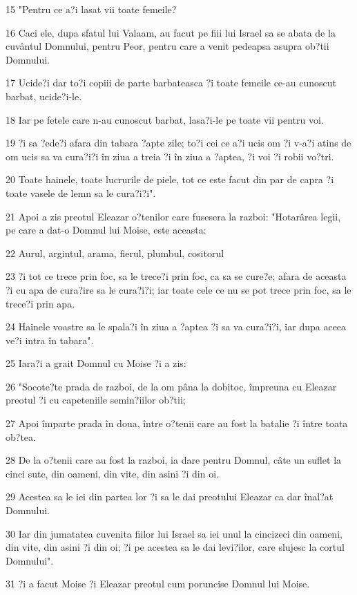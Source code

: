 \par 15 "Pentru ce a?i lasat vii toate femeile?
\par 16 Caci ele, dupa sfatul lui Valaam, au facut pe fiii lui Israel sa se abata de la cuvântul Domnului, pentru Peor, pentru care a venit pedeapsa asupra ob?tii Domnului.
\par 17 Ucide?i dar to?i copiii de parte barbateasca ?i toate femeile ce-au cunoscut barbat, ucide?i-le.
\par 18 Iar pe fetele care n-au cunoscut barbat, lasa?i-le pe toate vii pentru voi.
\par 19 ?i sa ?ede?i afara din tabara ?apte zile; to?i cei ce a?i ucis om ?i v-a?i atins de om ucis sa va cura?i?i în ziua a treia ?i în ziua a ?aptea, ?i voi ?i robii vo?tri.
\par 20 Toate hainele, toate lucrurile de piele, tot ce este facut din par de capra ?i toate vasele de lemn sa le cura?i?i".
\par 21 Apoi a zis preotul Eleazar o?tenilor care fusesera la razboi: "Hotarârea legii, pe care a dat-o Domnul lui Moise, este aceasta:
\par 22 Aurul, argintul, arama, fierul, plumbul, cositorul
\par 23 ?i tot ce trece prin foc, sa le trece?i prin foc, ca sa se cure?e; afara de aceasta ?i cu apa de cura?ire sa le cura?i?i; iar toate cele ce nu se pot trece prin foc, sa le trece?i prin apa.
\par 24 Hainele voastre sa le spala?i în ziua a ?aptea ?i sa va cura?i?i, iar dupa aceea ve?i intra în tabara".
\par 25 Iara?i a grait Domnul cu Moise ?i a zis:
\par 26 "Socote?te prada de razboi, de la om pâna la dobitoc, împreuna cu Eleazar preotul ?i cu capeteniile semin?iilor ob?tii;
\par 27 Apoi împarte prada în doua, între o?tenii care au fost la batalie ?i între toata ob?tea.
\par 28 De la o?tenii care au fost la razboi, ia dare pentru Domnul, câte un suflet la cinci sute, din oameni, din vite, din asini ?i din oi.
\par 29 Acestea sa le iei din partea lor ?i sa le dai preotului Eleazar ca dar înal?at Domnului.
\par 30 Iar din jumatatea cuvenita fiilor lui Israel sa iei unul la cincizeci din oameni, din vite, din asini ?i din oi; ?i pe acestea sa le dai levi?ilor, care slujesc la cortul Domnului".
\par 31 ?i a facut Moise ?i Eleazar preotul cum poruncise Domnul lui Moise.
